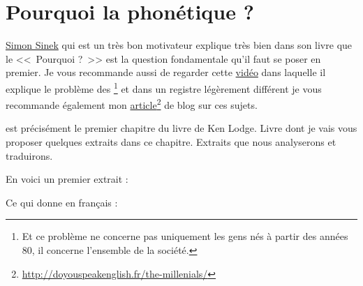 \chapter{Pourquoi la phonétique ?}\label{chap:phonetic}

\href{https://fr.wikipedia.org/wiki/Simon_Sinek}{Simon Sinek} qui est
un très bon motivateur explique très bien dans son livre
\href{https://amzn.to/2qY8uMD}{} que le
<<~Pourquoi ?~>> est la question fondamentale qu'il faut se poser en
premier. Je vous recommande aussi de regarder cette \href{https://youtu.be/hER0Qp6QJNU}{vidéo} dans
laquelle il explique le problème des \footnote{Et ce problème ne
  concerne pas uniquement les gens nés à partir des années 80, il concerne
  l'ensemble de la société.} et dans un registre légèrement différent je vous
recommande également mon \href{http://doyouspeakenglish.fr/the-millenials/}{article}\footnote{\url{http://doyouspeakenglish.fr/the-millenials/}} de blog sur ces sujets.  

 est précisément le premier chapitre du livre
\lodge de Ken Lodge. Livre dont je vais vous proposer quelques extraits dans ce
chapitre. Extraits que nous analyserons et traduirons.

En voici un premier extrait :


\begin{center}
\begin{mdframed}[style=citestyle, frametitle={Extrait de~\cite{lodge}}]
\end{mdframed}
\end{center}
  

Ce qui donne en français :

\begin{center}
\begin{mdframed}[style=tradstyle, frametitle={\exFR{Traduction} de l'extrait ci-dessus}]
\end{mdframed}  
\end{center}

